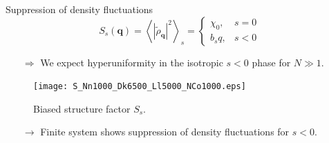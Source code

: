 \documentclass{beamer}
\begin{document}
{\begin{frame}[noframenumbering]{Suppression of density fluctuations}
\begin{equation}
S_s(\boldsymbol{q}) = \left<|\tilde{\rho}_{\boldsymbol{q}}|^2\right>_s = \begin{cases} \chi_0, &s = 0 \\ b_s q, &s < 0 \end{cases}
\end{equation}
\begin{itemize}
  \item[$\Rightarrow$] We expect hyperuniformity in the isotropic $s < 0$ phase for $N \gg 1$.
\end{itemize}

\begin{figure}
\centering
\texttt{[image: S\_Nn1000\_Dk6500\_Ll5000\_NCo1000.eps]}
\caption{Biased structure factor $S_s$.}
\end{figure}

\vspace{-10pt}
\begin{itemize}
  \item[$\rightarrow$] Finite system shows suppression of density fluctuations for $s < 0$.
\end{itemize}

\end{frame}

}
\end{document}
